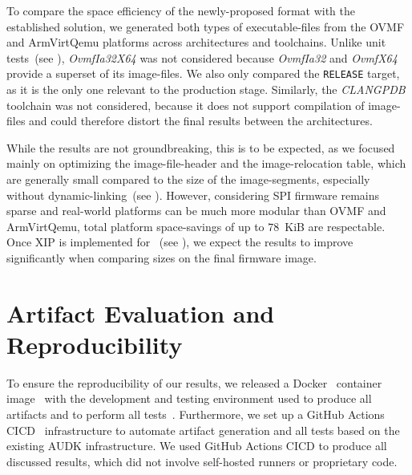 To compare the space efficiency of the newly-proposed  format with the established  solution, we generated both types of \glspl{executable-file} from the \gls{OVMF} and \gls{ArmVirtQemu} platforms across architectures and toolchains. Unlike unit tests~(see ), \textit{OvmfIa32X64} was not considered because \textit{OvmfIa32} and \textit{OvmfX64} provide a superset of its \glspl{image-file}. We also only compared the \texttt{RELEASE} target, as it is the only one relevant to the production stage. Similarly, the \textit{CLANGPDB} toolchain was not considered, because it does not support compilation of  \glspl{image-file} and could therefore distort the final results between the architectures.

While the results are not groundbreaking, this is to be expected, as we focused mainly on optimizing the \gls{image-file-header} and the \gls{image-relocation} table, which are generally small compared to the size of the \glspl{image-segment}, especially without \gls{dynamic-linking}~(see ). However, considering \gls{SPI} \gls{firmware} remains sparse and real-world platforms can be much more modular than \gls{OVMF} and \gls{ArmVirtQemu}, total platform space-savings of up to $78$~KiB are respectable. Once \gls{XIP} is implemented for ~(see ), we expect the results to improve significantly when comparing sizes on the final \gls{firmware} \gls{image}.







\section{Artifact Evaluation and Reproducibility}
\label{sec:repro}

To ensure the reproducibility of our results, we released a Docker~\cite{docker} container image~\cite{oci} with the development and testing environment used to produce all artifacts and to perform all tests~\cite{thesis-git}. Furthermore, we set up a GitHub Actions \gls{CICD}~\cite{gh-actions} infrastructure to automate artifact generation and all tests based on the existing \gls{AUDK} infrastructure. We used GitHub Actions \gls{CICD} to produce all discussed results, which did not involve self-hosted runners or proprietary code.

